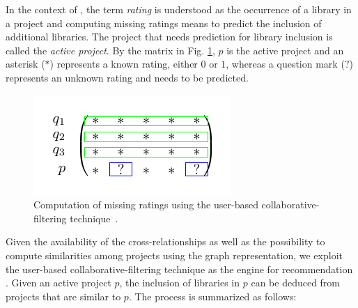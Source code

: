In the context of \CR, the term \emph{rating} is understood as the occurrence of a library in a project and computing missing ratings means to predict the inclusion of additional libraries. The project that needs prediction for library inclusion is called the \emph{active project}. By the matrix in Fig. \ref{fig:UserBasedCF}, $p$ is the active project and an asterisk ($*$) represents a known rating, either $0$ or $1$, whereas a question mark ($?$) represents an unknown rating and needs to be predicted.


\begin{figure}[t!]
	\centering
	\includegraphics[width=0.7\linewidth]{figs/UserBasedCF.pdf}
	\vspace{-.4cm}
	\caption{Computation of missing ratings using the user-based collaborative-filtering technique~\cite{Zhao:2010:UCR:1748610.1749278}.}%
	\vspace{-.1cm}
	\label{fig:UserBasedCF}
\end{figure}


Given the availability of the cross-relationships as well as the possibility to compute similarities among projects using the graph representation, we exploit the user-based collaborative-filtering technique as the engine for recommendation \cite{Linden:2003:ARI:642462.642471,Zhao:2010:UCR:1748610.1749278}. Given an active project $p$, the inclusion of libraries in $p$ can be deduced from projects that are similar to $p$. The process is summarized as follows: %

